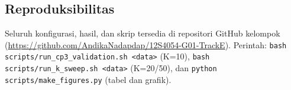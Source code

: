 \subsection{Reproduksibilitas}
Seluruh konfigurasi, hasil, dan skrip tersedia di repositori GitHub kelompok
(\url{https://github.com/AndikaNadapdap/12S4054-G01-TrackE}). Perintah:
\texttt{bash scripts/run\_cp3\_validation.sh <data>} (K=10),
\texttt{bash scripts/run\_k\_sweep.sh <data>} (K=20/50), dan
\texttt{python scripts/make\_figures.py} (tabel dan grafik).
